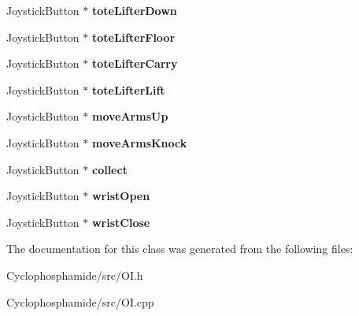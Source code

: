 \begin{DoxyCompactItemize}
\item 
\hypertarget{class_o_i_ad63f1e29bf862c03f710c422e0ba277e}{}Joystick\+Button $\ast$ {\bfseries tote\+Lifter\+Down}\label{class_o_i_ad63f1e29bf862c03f710c422e0ba277e}

\item 
\hypertarget{class_o_i_ad776b494657e4519dc8ef40fa7a55e54}{}Joystick\+Button $\ast$ {\bfseries tote\+Lifter\+Floor}\label{class_o_i_ad776b494657e4519dc8ef40fa7a55e54}

\item 
\hypertarget{class_o_i_a83df52f98c7df1592fad457c1c9018d1}{}Joystick\+Button $\ast$ {\bfseries tote\+Lifter\+Carry}\label{class_o_i_a83df52f98c7df1592fad457c1c9018d1}

\item 
\hypertarget{class_o_i_a0325e7b2a9652cd9a88675ae14948c0d}{}Joystick\+Button $\ast$ {\bfseries tote\+Lifter\+Lift}\label{class_o_i_a0325e7b2a9652cd9a88675ae14948c0d}

\item 
\hypertarget{class_o_i_a1fdfdcc5b5a1357eeecedc82a57c5085}{}Joystick\+Button $\ast$ {\bfseries move\+Arms\+Up}\label{class_o_i_a1fdfdcc5b5a1357eeecedc82a57c5085}

\item 
\hypertarget{class_o_i_a13093d5cb6fd46b3b7e265e24d9ff733}{}Joystick\+Button $\ast$ {\bfseries move\+Arms\+Knock}\label{class_o_i_a13093d5cb6fd46b3b7e265e24d9ff733}

\item 
\hypertarget{class_o_i_a52f4550ea9f788301cf5f77ffd406612}{}Joystick\+Button $\ast$ {\bfseries collect}\label{class_o_i_a52f4550ea9f788301cf5f77ffd406612}

\item 
\hypertarget{class_o_i_a73cafce878fd10b6a5543e029606f559}{}Joystick\+Button $\ast$ {\bfseries wrist\+Open}\label{class_o_i_a73cafce878fd10b6a5543e029606f559}

\item 
\hypertarget{class_o_i_ae3ffffcf8b54b38f13faf50a154aceb9}{}Joystick\+Button $\ast$ {\bfseries wrist\+Close}\label{class_o_i_ae3ffffcf8b54b38f13faf50a154aceb9}

\end{DoxyCompactItemize}


The documentation for this class was generated from the following files\+:\begin{DoxyCompactItemize}
\item 
Cyclophosphamide/src/O\+I.\+h\item 
Cyclophosphamide/src/O\+I.\+cpp\end{DoxyCompactItemize}
